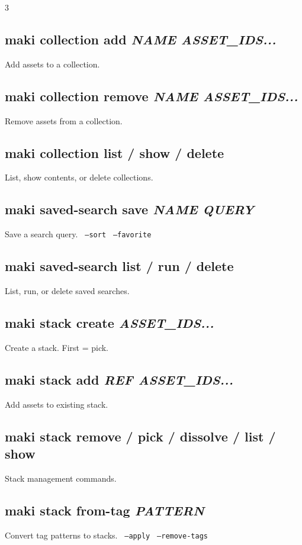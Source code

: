 \documentclass[a4paper,landscape,8pt]{article}
\newcommand{\opt}[1]{\texttt{\scriptsize\color{maki-stone} #1}}
\begin{document}
\begin{multicols}{3}
\subsection{maki collection add \textit{NAME ASSET\_IDS...}}
Add assets to a collection.

\subsection{maki collection remove \textit{NAME ASSET\_IDS...}}
Remove assets from a collection.

\subsection{maki collection list / show / delete}
List, show contents, or delete collections.

\subsection{maki saved-search save \textit{NAME QUERY}}
Save a search query. \opt{--sort} \opt{--favorite}

\subsection{maki saved-search list / run / delete}
List, run, or delete saved searches.

\subsection{maki stack create \textit{ASSET\_IDS...}}
Create a stack. First = pick.

\subsection{maki stack add \textit{REF ASSET\_IDS...}}
Add assets to existing stack.

\subsection{maki stack remove / pick / dissolve / list / show}
Stack management commands.

\subsection{maki stack from-tag \textit{PATTERN}}
Convert tag patterns to stacks. \opt{--apply} \opt{--remove-tags}


\end{multicols}
\end{document}
